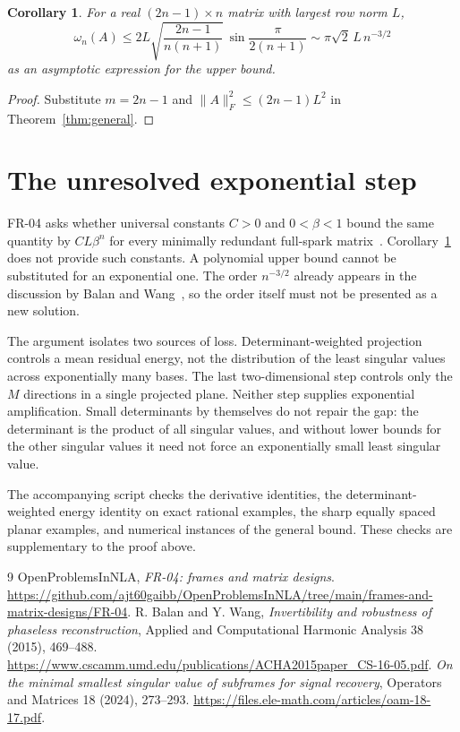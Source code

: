 \documentclass[11pt]{article}
\newtheorem{corollary}[theorem]{Corollary}\newtheorem{proposition}[theorem]{Proposition}
\begin{document}
\begin{corollary}\label{cor:critical}
For a real $(2n-1)\times n$ matrix with largest row norm $L$,
\[
 \omega_n(A)\le
 2L\sqrt{\frac{2n-1}{n(n+1)}}\,
 \sin\frac\pi{2(n+1)}
 \sim \pi\sqrt2\,L\,n^{-3/2}
\]
as an asymptotic expression for the upper bound.
\end{corollary}
\begin{proof}
Substitute $m=2n-1$ and $\|A\|_F^2\le(2n-1)L^2$ in Theorem~\ref{thm:general}.
\end{proof}

\section{The unresolved exponential step}
FR-04 asks whether universal constants $C>0$ and $0<\beta<1$ bound the same quantity by $CL\beta^n$ for every minimally redundant full-spark matrix~\cite{Repo}. Corollary~\ref{cor:critical} does not provide such constants. A polynomial upper bound cannot be substituted for an exponential one. The order $n^{-3/2}$ already appears in the discussion by Balan and Wang~\cite{BW}, so the order itself must not be presented as a new solution.

The argument isolates two sources of loss. Determinant-weighted projection controls a mean residual energy, not the distribution of the least singular values across exponentially many bases. The last two-dimensional step controls only the $M$ directions in a single projected plane. Neither step supplies exponential amplification. Small determinants by themselves do not repair the gap: the determinant is the product of all singular values, and without lower bounds for the other singular values it need not force an exponentially small least singular value.

The accompanying script checks the derivative identities, the determinant-weighted energy identity on exact rational examples, the sharp equally spaced planar examples, and numerical instances of the general bound. These checks are supplementary to the proof above.

\begin{thebibliography}{9}
 OpenProblemsInNLA, \emph{FR-04: frames and matrix designs}. \url{https://github.com/ajt60gaibb/OpenProblemsInNLA/tree/main/frames-and-matrix-designs/FR-04}.
 R. Balan and Y. Wang, \emph{Invertibility and robustness of phaseless reconstruction}, Applied and Computational Harmonic Analysis 38 (2015), 469--488. \url{https://www.cscamm.umd.edu/publications/ACHA2015paper_CS-16-05.pdf}.
 \emph{On the minimal smallest singular value of subframes for signal recovery}, Operators and Matrices 18 (2024), 273--293. \url{https://files.ele-math.com/articles/oam-18-17.pdf}.
\end{thebibliography}
\end{document}

